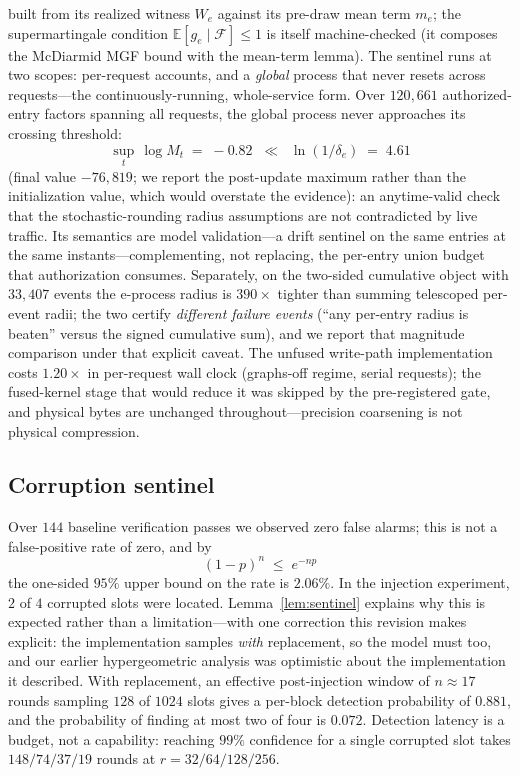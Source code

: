 \documentclass[11pt]{article}
\begin{document}
built from its realized witness $W_e$ against its pre-draw mean term
$m_e$; the supermartingale condition
$\mathbb{E}[g_e \mid \mathcal{F}] \le 1$ is itself machine-checked (it
composes the McDiarmid MGF bound with the mean-term lemma).
The sentinel runs at two scopes: per-request accounts, and a \emph{global}
process that never resets across requests---the continuously-running,
whole-service form. Over $120{,}661$ authorized-entry factors spanning all
requests, the global process never approaches its crossing threshold:
\begin{equation}
\sup_t\,\log M_t \;=\; -0.82
\;\;\ll\;\;
\ln(1/\delta_e) \;=\; 4.61
\label{eq:eprocesscheck}
\end{equation}
(final value $-76{,}819$; we report the post-update maximum rather than
the initialization value, which would overstate the evidence): an anytime-valid
check that the stochastic-rounding radius assumptions are not contradicted by
live traffic. Its semantics are model validation---a drift sentinel on the
same entries at the same instants---complementing, not replacing, the
per-entry union budget that authorization consumes. Separately, on the two-sided
cumulative object with $33{,}407$ events the e-process radius is $390\times$
tighter than summing telescoped per-event radii; the two certify
\emph{different failure events} (``any per-entry radius is beaten'' versus the
signed cumulative sum), and we report that magnitude comparison under that
explicit caveat. The unfused write-path
implementation costs $1.20\times$ in per-request wall clock (graphs-off
regime, serial requests); the fused-kernel stage that would reduce
it was skipped by the pre-registered gate, and physical bytes are unchanged
throughout---precision coarsening is not physical compression.

\subsection{Corruption sentinel}
Over $144$ baseline verification passes we observed zero false alarms; this is not a
false-positive rate of zero, and by
\begin{equation}
(1-p)^n \;\le\; e^{-np}
\label{eq:sentinelbound}
\end{equation}
the one-sided $95\%$
upper bound on the rate is $2.06\%$. In the injection experiment, $2$ of $4$
corrupted slots were located. Lemma~\ref{lem:sentinel} explains why this is expected
rather than a limitation---with one correction this revision makes explicit: the
implementation samples \emph{with} replacement, so the model must too, and our
earlier hypergeometric analysis was optimistic about the implementation it described.
With replacement, an effective post-injection window of $n\approx 17$ rounds
sampling $128$ of $1024$ slots gives a per-block detection probability of
$0.881$, and the probability of finding at most two of four is $0.072$.
Detection latency is a budget, not a capability: reaching $99\%$ confidence for a
single corrupted slot takes $148/74/37/19$ rounds at $r=32/64/128/256$.
\end{document}
